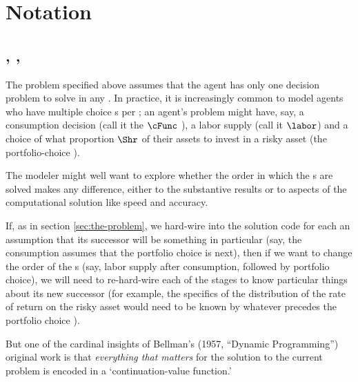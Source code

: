 \documentclass[\econtexRoot/SolvingMicroDSOPs]{subfiles}
\begin{document}
\hypertarget{notation}{}
\section{Notation}\label{sec:notation}

\subsection{\Intervals, \Stgs, \Moves}

The problem specified above assumes that the agent has only one decision problem to solve in any {\interval}.  In practice, it is increasingly common to model agents who have multiple choice {\stg}s per {\interval}; an agent's problem might have, say, a consumption decision (call it the $\cFunc$ {\stg}), a labor supply {\stg} (call it $\labor$) and a choice of what proportion $\Shr$ of their assets to invest in a risky asset (the portfolio-choice {\stg}).

The modeler might well want to explore whether the order in which the {\stg}s are solved makes any difference, either to the substantive results or to aspects of the computational solution like speed and accuracy.

If, as in section \ref{sec:the-problem}, we hard-wire into the solution code for each {\stg} an assumption that its successor {\stg} will be something in particular (say, the consumption {\stg} assumes that the portfolio choice is next), then if we want to change the order of the {\stg}s (say, labor supply after consumption, followed by portfolio choice), we will need to re-hard-wire each of the stages to know particular things about its new successor (for example, the specifics of the distribution of the rate of return on the risky asset would need to be known by whatever {\stg} precedes the portfolio choice {\stg}).

But one of the cardinal insights of Bellman's (1957, ``Dynamic Programming'') original work is that \emph{everything that matters} for the solution to the current problem is encoded in a `continuation-value function.' %
\end{document}
